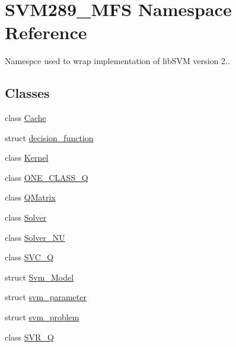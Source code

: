 \hypertarget{namespace_s_v_m289___m_f_s}{}\section{S\+V\+M289\+\_\+\+M\+FS Namespace Reference}
\label{namespace_s_v_m289___m_f_s}


Namespce used to wrap implementation of lib\+S\+VM version 2..  


\subsection*{Classes}
\begin{DoxyCompactItemize}
\item 
class \hyperlink{class_s_v_m289___m_f_s_1_1_cache}{Cache}
\item 
struct \hyperlink{struct_s_v_m289___m_f_s_1_1decision__function}{decision\+\_\+function}
\item 
class \hyperlink{class_s_v_m289___m_f_s_1_1_kernel}{Kernel}
\item 
class \hyperlink{class_s_v_m289___m_f_s_1_1_o_n_e___c_l_a_s_s___q}{O\+N\+E\+\_\+\+C\+L\+A\+S\+S\+\_\+Q}
\item 
class \hyperlink{class_s_v_m289___m_f_s_1_1_q_matrix}{Q\+Matrix}
\item 
class \hyperlink{class_s_v_m289___m_f_s_1_1_solver}{Solver}
\item 
class \hyperlink{class_s_v_m289___m_f_s_1_1_solver___n_u}{Solver\+\_\+\+NU}
\item 
class \hyperlink{class_s_v_m289___m_f_s_1_1_s_v_c___q}{S\+V\+C\+\_\+Q}
\item 
struct \hyperlink{struct_s_v_m289___m_f_s_1_1_svm___model}{Svm\+\_\+\+Model}
\item 
struct \hyperlink{struct_s_v_m289___m_f_s_1_1svm__parameter}{svm\+\_\+parameter}
\item 
struct \hyperlink{struct_s_v_m289___m_f_s_1_1svm__problem}{svm\+\_\+problem}
\item 
class \hyperlink{class_s_v_m289___m_f_s_1_1_s_v_r___q}{S\+V\+R\+\_\+Q}
\end{DoxyCompactItemize}

